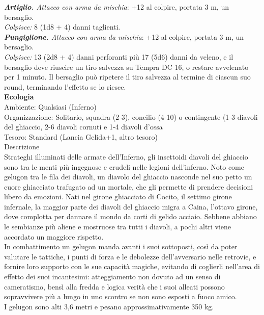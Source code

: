 \begin{multicols}{2}
\emph{\textbf{Artiglio.} Attacco con arma da mischia}: +12 al colpire, portata 3 m, un bersaglio.\\
\emph{Colpisce:} 8 (1d8 + 4) danni taglienti.\\
\emph{\textbf{Pungiglione.} Attacco con arma da mischia}: +12 al colpire, portata 3 m, un bersaglio.\\
\emph{Colpisce:} 13 (2d8 + 4) danni perforanti più 17 (5d6) danni da veleno, e il bersaglio deve riuscire un tiro salvezza su Tempra DC  16, o restare avvelenato per 1 minuto. Il bersaglio può ripetere il tiro salvezza al termine di ciascun suo round, terminando l'effetto se lo riesce.\\
\textbf{Ecologia}\\
Ambiente: Qualsiasi (Inferno)\\
Organizzazione: Solitario, squadra (2-3), concilio (4-10) o contingente (1-3 diavoli del ghiaccio, 2-6 diavoli cornuti e 1-4 diavoli d'ossa\\
Tesoro: Standard (Lancia Gelida+1, altro tesoro)\\
Descrizione\\
Strateghi illuminati delle armate dell'Inferno, gli insettoidi diavoli del ghiaccio sono tra le menti più ingegnose e crudeli nelle legioni dell'inferno. Noto come gelugon tra le fila dei diavoli, un diavolo del ghiaccio nasconde nel suo petto un cuore ghiacciato trafugato ad un mortale, che gli permette di prendere decisioni libero da emozioni. Nati nel girone ghiacciato di Cocito, il settimo girone infernale, la maggior parte dei diavoli del ghiaccio migra a Caina, l'ottavo girone, dove complotta per dannare il mondo da corti di gelido acciaio. Sebbene abbiano le sembianze più aliene e mostruose tra tutti i diavoli, a pochi altri viene accordato un maggiore rispetto.\\
In combattimento un gelugon manda avanti i suoi sottoposti, così da poter valutare le tattiche, i punti di forza e le debolezze dell'avversario nelle retrovie, e fornire loro supporto con le sue capacità magiche, evitando di coglierli nell'area di effetto dei suoi incantesimi: atteggiamento non dovuto ad un senso di cameratismo, bensì alla fredda e logica verità che i suoi alleati possono sopravvivere più a lungo in uno scontro se non sono esposti a fuoco amico.\\
I gelugon sono alti 3,6 metri e pesano approssimativamente 350 kg.\\


\end{multicols}
